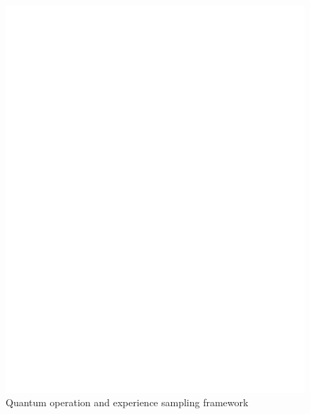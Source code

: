 \documentclass[journal]{IEEEtran}
\begin{document}
\begin{figure}[htbp]
    \centering
    \includegraphics[page=2,width=\linewidth,trim=0cm 6cm 0cm 3cm, clip]{Diagrams/QuantumOperationWorkflow.drawio (1).pdf}  %
    \caption{Quantum operation and experience sampling framework}
\label{fig:Quantum_Operation_and_Experience_Sampling_Workflow}
\end{figure}
\end{document}

